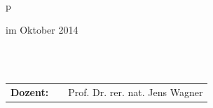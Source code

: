 \begin{center}
\begin{tabular}{p{\textwidth}}
\begin{center}
\large{im Oktober 2014}
\end{center}

\\

\\

\begin{center}
\begin{tabular}{lll}
\textbf{Dozent:} & & Prof. Dr. rer. nat. Jens Wagner\\
\end{tabular}
\end{center}

\end{tabular}
\end{center}